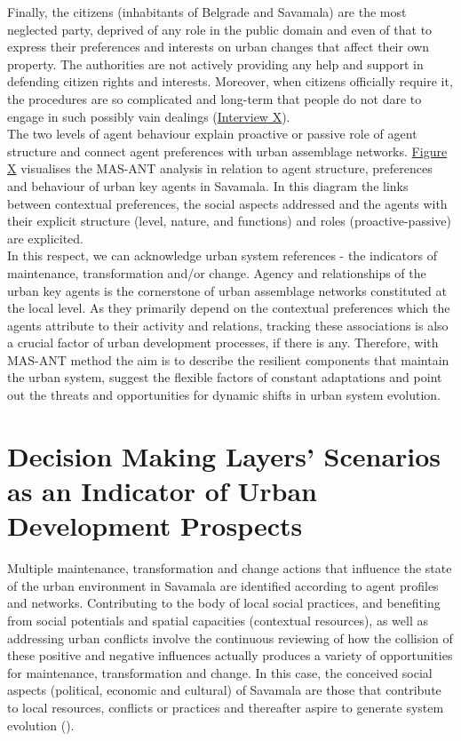 \documentclass[11pt]{report}
\begin{document}
Finally, the citizens (inhabitants of Belgrade and Savamala) are the most neglected party, deprived of any role in the public domain and even of that to express their preferences and interests on urban changes that affect their own property. 
The authorities are not actively providing any help and support in defending citizen rights and interests.
Moreover, when citizens officially require it, the procedures are so complicated and long-term that people do not dare to engage in such possibly vain dealings
(\href{InterviewX}{Interview X}).
\\

The two levels of agent behaviour explain proactive or passive role of agent structure and connect agent preferences with urban assemblage networks.
\href{FigureX}{Figure X} visualises the MAS-ANT analysis in relation to agent structure, preferences and behaviour of urban key agents in Savamala.
In this diagram the links between contextual preferences, the social aspects addressed and the agents with their explicit structure (level, nature, and functions) and roles (proactive-passive) are explicited.
\\

In this respect, we can acknowledge urban system references - the indicators of maintenance, transformation and/or change.
Agency and relationships of the urban key agents is the cornerstone of urban assemblage networks constituted at the local level.
As they primarily depend on the contextual preferences which the agents attribute to their activity and relations, tracking these associations is also a crucial factor of urban development processes, if there is any.
Therefore, with MAS-ANT method the aim is to describe the resilient components that maintain the urban system, suggest the flexible factors of constant adaptations and point out the threats and opportunities for dynamic shifts in urban system evolution.



\section{Decision Making Layers' Scenarios as an Indicator of Urban Development Prospects}

Multiple maintenance, transformation and change actions that influence the state of the urban environment in Savamala are identified according to agent profiles and networks.
Contributing to the body of local social practices, and benefiting from social potentials and spatial capacities (contextual resources), as well as addressing urban conflicts involve the continuous reviewing of how the collision of these positive and negative influences actually produces a variety of opportunities for maintenance, transformation and change.
In this case, the conceived social aspects (political, economic and cultural) of Savamala are those that contribute to local resources, conflicts or practices and thereafter aspire to generate system evolution (\href{Cvetinovic}{\cite{cvetinovic_engine_2013}}). 
\\
\end{document}
